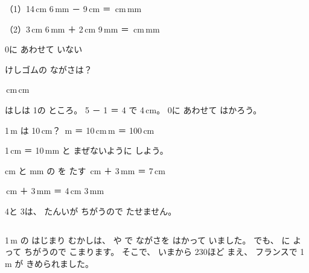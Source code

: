 \begin{jibun}
\noindent（1）14\,cm 6\,mm － 9\,cm ＝ \bkkakikomi\,cm\enspace\bkkakikomi\,mm\par\vspace{3pt}
\noindent（2）3\,cm 6\,mm ＋ 2\,cm 9\,mm ＝ \bkkakikomi\,cm\enspace\bkkakikomi\,mm
\end{jibun}

\clearpage

\begin{tsumazuki}{0に あわせて いない}
\noindent\begin{minipage}[c]{0.6\linewidth}
\end{minipage}\hfill
\begin{minipage}[c]{0.38\linewidth}
けしゴムの ながさは？\par
\bkbatsu{}\,cm\hspace{2\zw}\bkmaru{}\,cm
\end{minipage}\par\vspace{4pt}
はしは 1の ところ。 5 － 1 ＝ 4 で 4\,cm。 0に あわせて はかろう。
\end{tsumazuki}

\begin{tsumazuki}{1\,m は 10\,cm？}
\bkbatsu{}\,m ＝ 10\,cm\hspace{3\zw}\bkmaru{}\,m ＝ 100\,cm\par
1\,cm ＝ 10\,mm と まぜないように しよう。
\end{tsumazuki}

\begin{tsumazuki}{cm と mm の を たす}
\bkbatsu{}\,cm ＋ 3\,mm ＝ 7\,cm\par
\bkmaru{}\,cm ＋ 3\,mm ＝ 4\,cm 3\,mm\par
4と 3は、 たんいが ちがうので たせません。
\end{tsumazuki}

\begin{column}{1\,m の はじまり}
むかしは、 や で ながさを はかって いました。 でも、 に よって ちがうので こまります。 そこで、 いまから 230ほど まえ、 フランスで 1\,m が きめられました。
\end{column}

